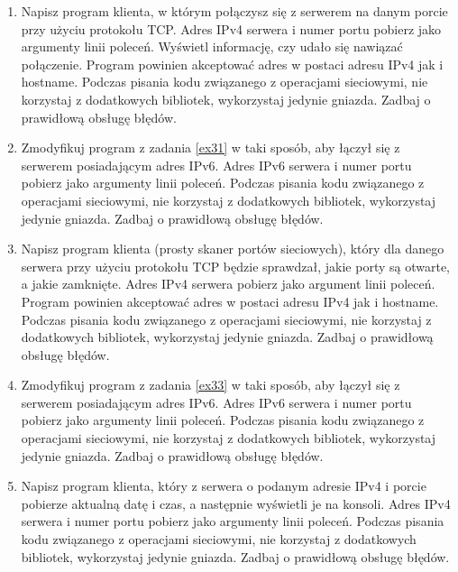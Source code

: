 \documentclass{article}
\begin{document}
\begin{enumerate}[label=\textbf{3.\arabic*}]\setlength{\itemsep}{1em}
    \item \label{ex31} Napisz program klienta, w którym połączysz się z serwerem na danym porcie przy użyciu protokołu TCP. Adres IPv4 serwera i numer portu pobierz jako argumenty linii poleceń. Wyświetl informację, czy udało się nawiązać połączenie. Program powinien akceptować adres w postaci adresu IPv4 jak i hostname. Podczas pisania kodu związanego z operacjami sieciowymi, nie korzystaj z dodatkowych bibliotek, wykorzystaj jedynie gniazda. Zadbaj o prawidłową obsługę błędów. 
    
    \item Zmodyfikuj program z zadania \ref{ex31} w taki sposób, aby łączył się z serwerem posiadającym adres IPv6.  Adres IPv6 serwera i numer portu pobierz jako argumenty linii poleceń. Podczas pisania kodu związanego z operacjami sieciowymi, nie korzystaj z dodatkowych bibliotek, wykorzystaj jedynie gniazda. Zadbaj o prawidłową obsługę błędów. 
    
    \item \label{ex33} Napisz program klienta (prosty skaner portów sieciowych), który dla danego serwera przy użyciu protokołu TCP będzie sprawdzał, jakie porty są otwarte, a jakie zamknięte. Adres IPv4 serwera pobierz jako argument linii poleceń. Program powinien akceptować adres w postaci adresu IPv4 jak i hostname.  Podczas pisania kodu związanego z operacjami sieciowymi, nie korzystaj z dodatkowych bibliotek, wykorzystaj jedynie gniazda. Zadbaj o prawidłową obsługę błędów. 
    
    \item  Zmodyfikuj program z zadania \ref{ex33} w taki sposób,  aby łączył się z serwerem posiadającym adres IPv6.  Adres IPv6 serwera i numer portu pobierz jako argumenty linii poleceń. Podczas pisania kodu związanego z operacjami sieciowymi, nie korzystaj z dodatkowych bibliotek, wykorzystaj jedynie gniazda. Zadbaj o prawidłową obsługę błędów. 
    
    \item \label{ex35} Napisz program klienta, który z serwera o podanym adresie IPv4 i porcie pobierze aktualną datę i czas, a następnie wyświetli je na konsoli.  Adres IPv4 serwera i numer portu pobierz jako argumenty linii poleceń. Podczas pisania kodu związanego z operacjami sieciowymi, nie korzystaj z dodatkowych bibliotek, wykorzystaj jedynie gniazda. Zadbaj o prawidłową obsługę błędów. 
    

\end{enumerate}
\end{document}

